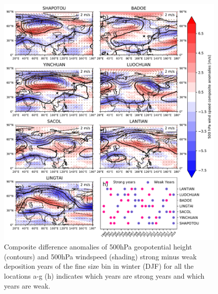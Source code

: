 \begin{figure}[hptb]
    \centering
    \includegraphics[width=\columnwidth]{texfiles/figs/2micrion_DJF_ws_geopot_500hPa.pdf}
    \caption{Composite difference anomalies of 500hPa geopotential height (contours) and 500hPa windspeed (shading) strong minus weak deposition years of the fine size bin in winter (DJF) for all the locations a-g  (h) indicates which years are strong years and which years are weak.}
    \label{fig:DJF_500hPa_fine_composite}
\end{figure}

